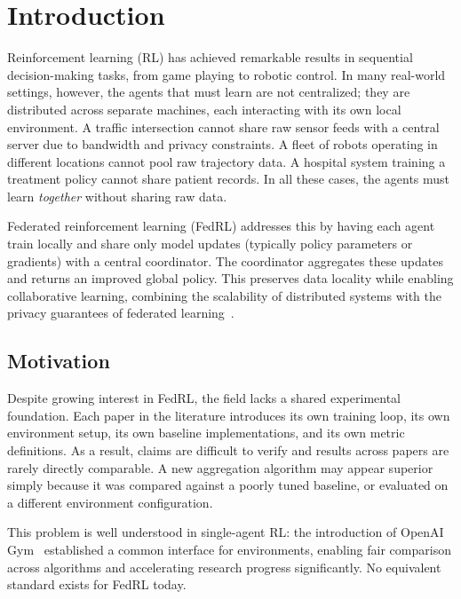\documentclass[a4paper, oneside]{discothesis}
\begin{document}
\tableofcontents

\mainmatter %

\chapter{Introduction}
\label{chap:introduction}

Reinforcement learning (RL) has achieved remarkable results in sequential decision-making tasks, from game playing to robotic control. In many real-world settings, however, the agents that must learn are not centralized; they are distributed across separate machines, each interacting with its own local environment. A traffic intersection cannot share raw sensor feeds with a central server due to bandwidth and privacy constraints. A fleet of robots operating in different locations cannot pool raw trajectory data. A hospital system training a treatment policy cannot share patient records. In all these cases, the agents must learn \emph{together} without sharing raw data.

Federated reinforcement learning (FedRL) addresses this by having each agent train locally and share only model updates (typically policy parameters or gradients) with a central coordinator. The coordinator aggregates these updates and returns an improved global policy. This preserves data locality while enabling collaborative learning, combining the scalability of distributed systems with the privacy guarantees of federated learning~\cite{FLsurvey}.

\section{Motivation}

Despite growing interest in FedRL, the field lacks a shared experimental foundation. Each paper in the literature introduces its own training loop, its own environment setup, its own baseline implementations, and its own metric definitions. As a result, claims are difficult to verify and results across papers are rarely directly comparable. A new aggregation algorithm may appear superior simply because it was compared against a poorly tuned baseline, or evaluated on a different environment configuration.

This problem is well understood in single-agent RL: the introduction of OpenAI Gym~\cite{OpenAIGym} established a common interface for environments, enabling fair comparison across algorithms and accelerating research progress significantly. No equivalent standard exists for FedRL today.
\end{document}
